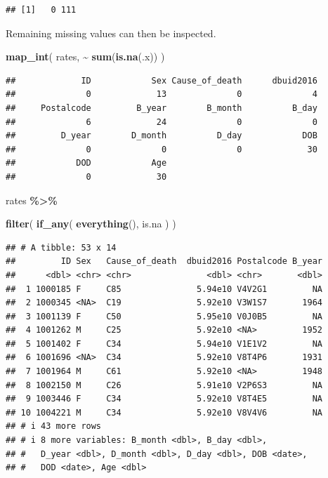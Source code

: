 \documentclass[
  11pt,
  oneside]{book}
\newenvironment{Shaded}{\begin{snugshade}}{\end{snugshade}}
\newcommand{\FunctionTok}[1]{\textcolor[rgb]{0.13,0.29,0.53}{\textbf{#1}}}
\newcommand{\NormalTok}[1]{#1}
\newcommand{\SpecialCharTok}[1]{\textcolor[rgb]{0.81,0.36,0.00}{\textbf{#1}}}
\begin{document}
\begin{verbatim}
## [1]   0 111
\end{verbatim}

Remaining missing values can then be inspected.

\begin{Shaded}
\begin{Highlighting}[]
\FunctionTok{map\_int}\NormalTok{(}
\NormalTok{  rates,}
  \SpecialCharTok{\textasciitilde{}} \FunctionTok{sum}\NormalTok{(}\FunctionTok{is.na}\NormalTok{(.x))}
\NormalTok{)}
\end{Highlighting}
\end{Shaded}

\begin{verbatim}
##             ID            Sex Cause_of_death      dbuid2016 
##              0             13              0              4 
##     Postalcode         B_year        B_month          B_day 
##              6             24              0              0 
##         D_year        D_month          D_day            DOB 
##              0              0              0             30 
##            DOD            Age 
##              0             30
\end{verbatim}

\begin{Shaded}
\begin{Highlighting}[]
\NormalTok{rates }\SpecialCharTok{\%\textgreater{}\%}
  
  \FunctionTok{filter}\NormalTok{(}
    \FunctionTok{if\_any}\NormalTok{(}
      \FunctionTok{everything}\NormalTok{(),}
\NormalTok{      is.na}
\NormalTok{    )}
\NormalTok{  )}
\end{Highlighting}
\end{Shaded}

\begin{verbatim}
## # A tibble: 53 x 14
##         ID Sex   Cause_of_death  dbuid2016 Postalcode B_year
##      <dbl> <chr> <chr>               <dbl> <chr>       <dbl>
##  1 1000185 F     C85               5.94e10 V4V2G1         NA
##  2 1000345 <NA>  C19               5.92e10 V3W1S7       1964
##  3 1001139 F     C50               5.95e10 V0J0B5         NA
##  4 1001262 M     C25               5.92e10 <NA>         1952
##  5 1001402 F     C34               5.94e10 V1E1V2         NA
##  6 1001696 <NA>  C34               5.92e10 V8T4P6       1931
##  7 1001964 M     C61               5.92e10 <NA>         1948
##  8 1002150 M     C26               5.91e10 V2P6S3         NA
##  9 1003446 F     C34               5.92e10 V8T4E5         NA
## 10 1004221 M     C34               5.92e10 V8V4V6         NA
## # i 43 more rows
## # i 8 more variables: B_month <dbl>, B_day <dbl>,
## #   D_year <dbl>, D_month <dbl>, D_day <dbl>, DOB <date>,
## #   DOD <date>, Age <dbl>
\end{verbatim}
\end{document}
